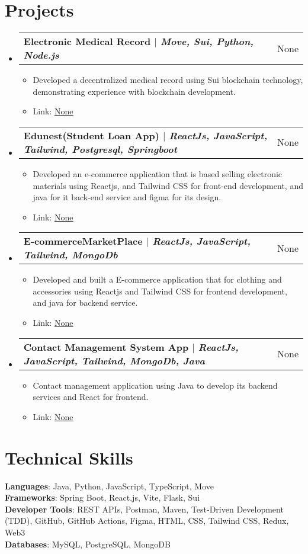 \documentclass[letterpaper,11pt]{article}
\makeatletter
\newcommand{\resumeItem}[1]{
  \item\small{
    {#1 \vspace{-2pt}}
  }
}
\newcommand{\resumeProjectHeading}[2]{
    \item
    \begin{tabular*}{0.97\textwidth}{l@{\extracolsep{\fill}}r}
      \small#1 & #2 \\
    \end{tabular*}\vspace{-7pt}
}
\newcommand{\resumeSubHeadingListStart}{\begin{itemize}[leftmargin=0.15in, label={}]}
\newcommand{\resumeSubHeadingListEnd}{\end{itemize}}
\newcommand{\resumeItemListStart}{\begin{itemize}}
\newcommand{\resumeItemListEnd}{\end{itemize}\vspace{-5pt}}
\makeatother
\begin{document}
\section{Projects}
    \resumeSubHeadingListStart
      \resumeProjectHeading
          {\textbf{Electronic Medical Record $|$ \emph{Move, Sui, Python, Node.js}}}{None}
          \resumeItemListStart
            \resumeItem{Developed a decentralized medical record using Sui blockchain technology, demonstrating experience with blockchain development.}
            \resumeItem{Link: \href{None}{\underline{None}}}
          \resumeItemListEnd
      \resumeProjectHeading
          {\textbf{Edunest(Student Loan App) $|$ \emph{ReactJs, JavaScript, Tailwind, Postgresql, Springboot}}}{None}
          \resumeItemListStart
            \resumeItem{Developed an e-commerce application that is based selling electronic materials using Reactjs, and Tailwind CSS for front-end development, and java for it back-end service and figma for its design.}
            \resumeItem{Link: \href{None}{\underline{None}}}
          \resumeItemListEnd
      \resumeProjectHeading
          {\textbf{E-commerceMarketPlace $|$ \emph{ReactJs, JavaScript, Tailwind, MongoDb}}}{None}
          \resumeItemListStart
            \resumeItem{Developed and built a E-commerce application that for clothing and accessories using Reactjs and Tailwind CSS for frontend development, and java for backend service.}
            \resumeItem{Link: \href{None}{\underline{None}}}
          \resumeItemListEnd
      \resumeProjectHeading
          {\textbf{Contact Management System App $|$ \emph{ReactJs, JavaScript, Tailwind, MongoDb, Java}}}{None}
          \resumeItemListStart
            \resumeItem{Contact management application using Java to develop its backend services and React for frontend.}
            \resumeItem{Link: \href{None}{\underline{None}}}
          \resumeItemListEnd
    \resumeSubHeadingListEnd

\section{Technical Skills}
 \begin{itemize}[leftmargin=0.15in, label={}]
    \small{\item{
     \textbf{Languages}: Java, Python, JavaScript, TypeScript, Move \\
     \textbf{Frameworks}: Spring Boot, React.js, Vite, Flask, Sui \\
     \textbf{Developer Tools}: REST APIs, Postman, Maven, Test-Driven Development (TDD), GitHub, GitHub Actions, Figma, HTML, CSS, Tailwind CSS, Redux, Web3 \\
     \textbf{Databases}: MySQL, PostgreSQL, MongoDB
    }}
 \end{itemize}

\end{document}
